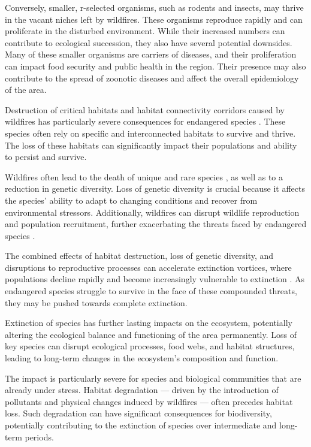 \documentclass[
  12 pt,
]{Nemilov}
\begin{document}
Conversely, smaller, r-selected organisms, such as rodents and insects, may thrive in the vacant niches left by wildfires. These organisms reproduce rapidly and can proliferate in the disturbed environment. While their increased numbers can contribute to ecological succession, they also have several potential downsides. Many of these smaller organisms are carriers of diseases, and their proliferation can impact food security and public health in the region. Their presence may also contribute to the spread of zoonotic diseases and affect the overall epidemiology of the area.

Destruction of critical habitats and habitat connectivity corridors caused by wildfires has particularly severe consequences for endangered species \citep{butcher2019wildfire, khosravi2022spatially, tracey2018prioritizing}. These species often rely on specific and interconnected habitats to survive and thrive. The loss of these habitats can significantly impact their populations and ability to persist and survive.

Wildfires often lead to the death of unique and rare species \citep{ager2007modeling}, as well as to a reduction in genetic diversity. Loss of genetic diversity is crucial because it affects the species' ability to adapt to changing conditions and recover from environmental stressors. Additionally, wildfires can disrupt wildlife reproduction and population recruitment, further exacerbating the threats faced by endangered species \citep{awadhiya2021principles, lam2020wildfire, potvin2017genetic}.

The combined effects of habitat destruction, loss of genetic diversity, and disruptions to reproductive processes can accelerate extinction vortices, where populations decline rapidly and become increasingly vulnerable to extinction \citep{bond2003impacts, lindenmayer1995modelling, santelices2022assessment}. As endangered species struggle to survive in the face of these compounded threats, they may be pushed towards complete extinction.

Extinction of species has further lasting impacts on the ecosystem, potentially altering the ecological balance and functioning of the area permanently. Loss of key species can disrupt ecological processes, food webs, and habitat structures, leading to long-term changes in the ecosystem's composition and function.

The impact is particularly severe for species and biological communities that are already under stress. Habitat degradation --- driven by the introduction of pollutants and physical changes induced by wildfires --- often precedes habitat loss. Such degradation can have significant consequences for biodiversity, potentially contributing to the extinction of species over intermediate and long-term periods.
\end{document}
